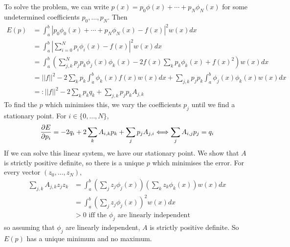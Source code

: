 \begin{example}
	To solve the problem, we can write $p(x) = p_0 \phi(x) + \cdots + p_N \phi_N(x)$ for some undetermined coefficients $p_0, \ldots, p_N$. Then
	\[
		\begin{aligned}
			E(p) & = \int_a^b |p_0 \phi_0(x) + \cdots + p_N \phi_N(x) - f(x)|^2 w(x) dx \\
			& = \int_{a}^{b} \left| \sum_{i = 0}^N p_i \phi_i(x) - f(x) \right|^2 w(x) dx \\
			& = \int_{a}^{b} \left( \sum_{j, k}^N p_j p_k \phi_j(x) \phi_k(x) - 2 f(x) \sum_k p_k \phi_k(x) + {f(x)}^2 \right) w(x) dx \\
			& = ||f||^2 - 2 \sum_k p_k \int_{a}^{b} \phi_k(x) f(x) w(x) dx + \sum_{j, k} p_j p_k \int_{a}^{b} \phi_j(x) \phi_k(x) w(x) dx \\
			& =: ||f||^2 - 2 \sum_k p_k q_k + \sum_{j, k} p_j p_k A_{j, k}
		\end{aligned}
	\]
	To find the $p$ which minimises this, we vary the coefficients $p_j$ until we find a stationary point. For $i \in \{0, \ldots, N\}$,
	\[
		\diffp{E}{p_i} = -2 q_i + 2 \sum_k A_{i, k} p_k + \sum_j p_j A_{j, i} \Longleftrightarrow \sum_j A_{i, j} p_j = q_i
	\]
	If we can solve this linear system, we have our stationary point. We show that $A$ is strictly positive definite, so there is a unique $p$ which minimises the error. For every vector $(z_0, \ldots, z_N)$,
	\[
		\begin{aligned}
			\sum_{j, k} A_{j, k} z_j z_k & = \int_{a}^{b} \left( \sum_j z_j \phi_j(x) \right) \left( \sum_k z_k \phi_k(x) \right) w(x) dx \\
			& = \int_{a}^{b} \left( \sum_j z_j \phi_j(x) \right)^2 w(x) dx \\
			& > 0 \text{ iff the } \phi_j \text{ are linearly independent}
		\end{aligned}
	\]
	so assuming that $\phi_j$ are linearly independent, $A$ is strictly positive definite. So $E(p)$ has a unique minimum and no maximum.
\end{example}

